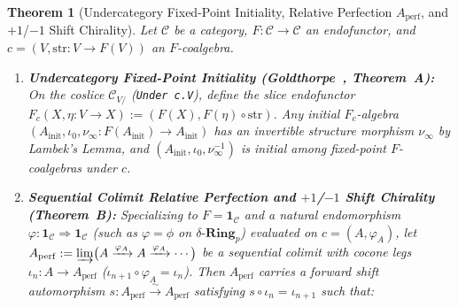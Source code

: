 \documentclass[10pt,twoside,openright]{book}
\theoremstyle{crmplain}
\newtheorem{theorem}{Theorem}[section]
\theoremstyle{crmdef}
\theoremstyle{crmremark}
\newcommand{\lean}[1]{\ignorespaces}
\newcommand{\leanok}{\ignorespaces}
\begin{document}
\begin{theorem}[Undercategory Fixed-Point Initiality, Relative Perfection $A_{\mathrm{perf}}$, and $+1$/$-1$ Shift Chirality]\label{thm:slice-perfection-chirality}%
\lean{HomotopyCRM.lambek_isIso, HomotopyCRM.sliceLambek_right_isIso, HomotopyCRM.theoremA_homEquiv, HomotopyCRM.theoremA_isInitial_fixedPointCoalgebraUnder, HomotopyCRM.endomorphismColimitShiftIso, HomotopyCRM.theoremB_natEndo_app_eq_shift_inv, HomotopyCRM.theoremB_isIso_natEndo_app, HomotopyCRM.theoremB_perfectionSliceAlg_isInitial, HomotopyCRM.DualInt.instDeltaRing2, HomotopyCRM.DualInt.not_isPerfectDeltaRing, HomotopyCRM.DualInt.perfectionDeltaCocone_isColimit, HomotopyCRM.DualInt.perfectionSliceAlgDualInt_isInitial, HomotopyCRM.initFixedPointCoalgebraUnder, HomotopyCRM.ι_comp_shiftIso_hom, HomotopyCRM.Checks.dualInt_frobeniusLift_idem}%
\leanok%
%
Let $\mathcal{C}$ be a category, $F : \mathcal{C} \to \mathcal{C}$ an endofunctor, and $c = (V, \mathrm{str} : V \to F(V))$ an $F$-coalgebra.
\begin{enumerate}[label=\textup{(\roman*)},leftmargin=2.0em]
  \item \textbf{Undercategory Fixed-Point Initiality (Goldthorpe~\cite[Prop.~2.3.13]{Goldthorpe23}, Theorem~A):} On the coslice $\mathcal{C}_{V/}$ (\texttt{Under c.V}), define the slice endofunctor $F_c(X, \eta : V \to X) := (F(X), F(\eta) \circ \mathrm{str})$. Any initial $F_c$-algebra $(A_{\mathrm{init}}, \iota_0, \nu_\infty : F(A_{\mathrm{init}}) \to A_{\mathrm{init}})$ has an invertible structure morphism $\nu_\infty$ by Lambek's Lemma, and $(A_{\mathrm{init}}, \iota_0, \nu_\infty^{-1})$ is initial among fixed-point $F$-coalgebras under $c$.
  \item \textbf{Sequential Colimit Relative Perfection and $+1$/$-1$ Shift Chirality (Theorem~B):} Specializing to $F = \mathbf{1}_{\mathcal{C}}$ and a natural endomorphism $\varphi : \mathbf{1}_{\mathcal{C}} \Rightarrow \mathbf{1}_{\mathcal{C}}$ (such as $\varphi = \phi$ on $\delta\text{-}\mathbf{Ring}_p$) evaluated on $c = (A, \varphi_A)$, let $A_{\mathrm{perf}} := \varinjlim \bigl(A \xrightarrow{\varphi_A} A \xrightarrow{\varphi_A} \cdots\bigr)$ be a sequential colimit with cocone legs $\iota_n : A \to A_{\mathrm{perf}}$ ($\iota_{n+1} \circ \varphi_A = \iota_n$). Then $A_{\mathrm{perf}}$ carries a forward shift automorphism $s : A_{\mathrm{perf}} \xrightarrow{\sim} A_{\mathrm{perf}}$ satisfying $s \circ \iota_n = \iota_{n+1}$ such that:
  \begin{enumerate}[label=\textup{(\alph*)},leftmargin=1.6em]

\end{enumerate}
\end{enumerate}
\end{theorem}
\end{document}
